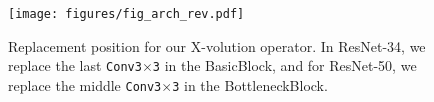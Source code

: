 \documentclass{article}
\begin{document}
\begin{figure}[t]
\begin{minipage}[t!]{0.47\textwidth}
\begin{spacing}{1.05}
        \label{tab_cls}
        \vspace{-2mm}
        \end{spacing}
    \end{minipage}
    \hspace{5.0mm}
    \begin{minipage}[t!]{0.47\textwidth}
\small
        \texttt{[image: figures/fig\_arch\_rev.pdf]}
        \caption{
        Replacement position for our X-volution operator. In ResNet-34, we replace the last \texttt{Conv3$\times$3} in the BasicBlock, and for ResNet-50, we replace the middle \texttt{Conv3$\times$3} in the BottleneckBlock.
        }
        \label{fig:arch}
    \end{minipage}
    \vspace{-2mm}
\end{figure}
\end{document}
